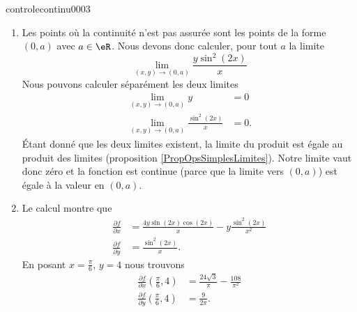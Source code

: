 \begin{corrige}{controlecontinu0003}

    \begin{enumerate}
        \item
            Les points où la continuité n'est pas assurée sont les points de la forme \( (0,a)\) avec \( a\in\eR\). Nous devons donc calculer, pour tout \( a\) la limite
            \begin{equation}
                \lim_{(x,y)\to(0,a)}\frac{ y\sin^2(2x) }{ x }
            \end{equation}
            Nous pouvons calculer séparément les deux limites
            \begin{subequations}
                \begin{align}
                    \lim_{(x,y)\to(0,a)}y&=0\\
                    \lim_{(x,y)\to(0,a)}\frac{ \sin^2(2x) }{ x }&=0.
                \end{align}
            \end{subequations}
            Étant donné que les deux limites existent, la limite du produit est égale au produit des limites (proposition \ref{PropOpsSimplesLimites}). Notre limite vaut donc zéro et la fonction est continue (parce que la limite vers \( (0,a)\)) est égale à la valeur en \( (0,a)\).

            \item
                Le calcul montre que 
                \begin{subequations}        \label{SubeqsDerpartGAzztc}
                    \begin{align}
                        \frac{ \partial f }{ \partial x }&=\frac{ 4y\sin(2x)\cos(2x) }{ x }-y\frac{ \sin^2(2x) }{ x^2 }\\
                        \frac{ \partial f }{ \partial y }&=\frac{ \sin^2(2x) }{ x }.
                    \end{align}
                \end{subequations}
                En posant \( x=\frac{ \pi }{ 6 }\), \( y=4\) nous trouvons
                \begin{subequations}
                    \begin{align}
                        \frac{ \partial f }{ \partial x }(\frac{ \pi }{ 6 },4)&=\frac{ 24\sqrt{3} }{ \pi }-\frac{ 108 }{ \pi^2 }\\
                        \frac{ \partial f }{ \partial y }(\frac{ \pi }{ 6 },4)&=\frac{ 9 }{ 2\pi }.
                    \end{align}
                \end{subequations}
                

\end{enumerate}
\end{corrige}
